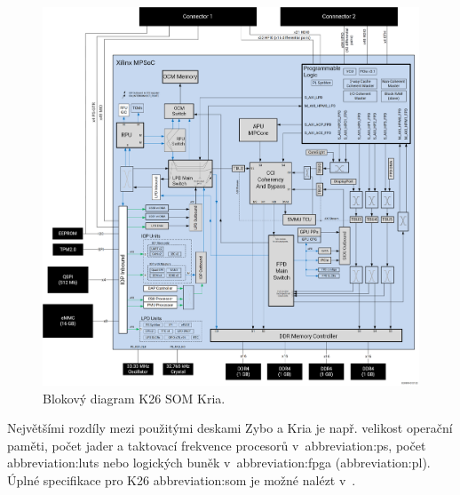 \documentclass[a4paper, twoside, 11pt]{article}
\newcommand{\fbar}{\FloatBarrier}
\begin{document}
						\begin{figure}[htbp!]
							\centering
								\includegraphics[width=1\textwidth]{src/jpg/xilinx-kria-k26-block-diagram.jpg} 
								\caption{Blokový diagram K26 SOM Kria. \cite{kria-k26-som-ds}}
								\label{fig:xilinx-kria-k26-block-diagram}
						\end{figure}
						\fbar

						Největšími rozdíly mezi použitými deskami Zybo a Kria je např. velikost operační paměti, počet jader a taktovací frekvence procesorů v~\gls{abbreviation:ps}, počet \gls{abbreviation:luts} nebo logických buněk v~\gls{abbreviation:fpga} (\gls{abbreviation:pl}). Úplné specifikace pro K26 \gls{abbreviation:som} je možné nalézt v~\cite{kria-k26-som-ds}.
\end{document}
